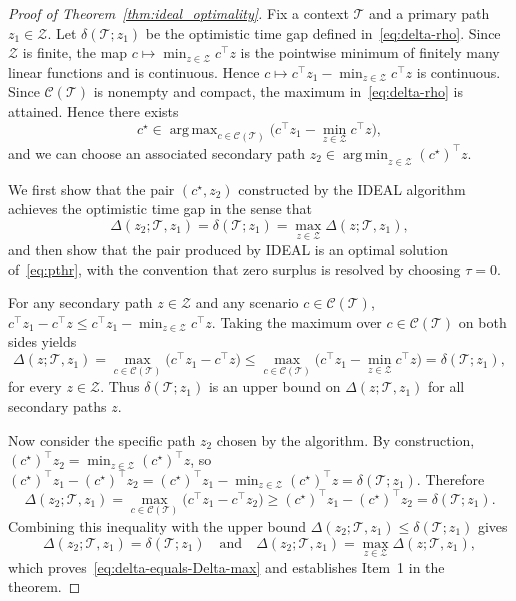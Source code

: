 \documentclass[10pt,a4paper]{amsart}
\DeclareMathOperator*{\argmax}{arg\,max}
\DeclareMathOperator*{\argmin}{arg\,min}
\newcommand{\opt}{^\star}
\begin{document}
\begin{proof}[Proof of Theorem~\ref{thm:ideal_optimality}]
Fix a context $\mathcal T$ and a primary path $z_1 \in \mathcal Z$. Let $\delta(\mathcal T; z_1)$ be the optimistic time gap defined in~\eqref{eq:delta-rho}. Since $\mathcal Z$ is finite, the map $c\mapsto \min_{z\in\mathcal Z}c^\top z$ is the pointwise minimum of finitely many linear functions and is continuous. Hence $c\mapsto c^\top z_1-\min_{z\in\mathcal Z}c^\top z$ is continuous. Since $\mathcal C(\mathcal T)$ is nonempty and compact, the maximum in~\eqref{eq:delta-rho} is attained. Hence there exists
\[
c\opt \in \argmax_{c\in\mathcal C(\mathcal T)}
\bigl(c^\top z_1 - \min_{z\in\mathcal Z} c^\top z\bigr),
\]
and we can choose an associated secondary path $z_2 \in \argmin_{z\in\mathcal Z} (c\opt)^\top z$.

We first show that the pair $(c\opt,z_2)$ constructed by the IDEAL algorithm achieves the optimistic time gap in the sense that
\begin{equation}
\label{eq:delta-equals-Delta-max}
\Delta(z_2;\mathcal T,z_1) = \delta(\mathcal T; z_1)
= \max_{z\in\mathcal Z} \Delta(z;\mathcal T,z_1),
\end{equation}
and then show that the pair produced by IDEAL is an optimal solution of~\eqref{eq:pthr}, with the convention that zero surplus is resolved by choosing $\tau=0$.

For any secondary path $z\in\mathcal Z$ and any scenario $c\in\mathcal C(\mathcal T)$,
$c^\top z_1 - c^\top z \le c^\top z_1 - \min_{z\in\mathcal Z} c^\top z$. Taking the maximum over $c\in\mathcal C(\mathcal T)$ on both sides yields
\[
\Delta(z;\mathcal T,z_1)
= \max_{c\in\mathcal C(\mathcal T)} \bigl(c^\top z_1 - c^\top z\bigr)
\le
\max_{c\in\mathcal C(\mathcal T)}\bigl(c^\top z_1 - \min_{z\in\mathcal Z} c^\top z\bigr)
= \delta(\mathcal T; z_1),
\]
for every $z\in\mathcal Z$. Thus $\delta(\mathcal T; z_1)$ is an upper bound on $\Delta(z;\mathcal T,z_1)$ for all secondary paths $z$.

Now consider the specific path $z_2$ chosen by the algorithm. By construction, $(c\opt)^\top z_2 = \min_{z\in\mathcal Z} (c\opt)^\top z$, so
$(c\opt)^\top z_1 - (c\opt)^\top z_2
= (c\opt)^\top z_1 - \min_{z\in\mathcal Z} (c\opt)^\top z
= \delta(\mathcal T; z_1)$.
Therefore
\[
\Delta(z_2;\mathcal T,z_1)
= \max_{c\in\mathcal C(\mathcal T)} \bigl(c^\top z_1 - c^\top z_2\bigr)
\ge
(c\opt)^\top z_1 - (c\opt)^\top z_2
= \delta(\mathcal T; z_1).
\]
Combining this inequality with the upper bound $\Delta(z_2;\mathcal T,z_1)\le \delta(\mathcal T; z_1)$ gives
\[
\Delta(z_2;\mathcal T,z_1) = \delta(\mathcal T; z_1)
\quad\text{and}\quad
\Delta(z_2;\mathcal T,z_1) = \max_{z\in\mathcal Z} \Delta(z;\mathcal T,z_1),
\]
which proves~\eqref{eq:delta-equals-Delta-max} and establishes Item~1 in the theorem.


\end{proof}
\end{document}
